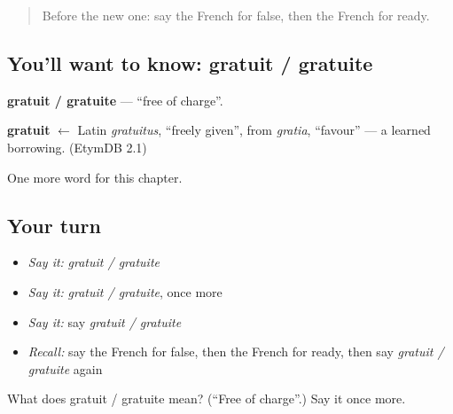 \label{lesson:FR-C245-gratuit-gratuite}



\begin{quote}
Before the new one: say the French for false, then the French for ready.
\end{quote}

\subsection*{You'll want to know: gratuit / gratuite}
\textbf{gratuit / gratuite} — \textquotedblleft{}free of charge\textquotedblright{}.

\begin{cousinweb}
\textbf{gratuit} $\leftarrow$ Latin \emph{gratuitus}, \textquotedblleft{}freely given\textquotedblright{}, from \emph{gratia}, \textquotedblleft{}favour\textquotedblright{} — a learned borrowing. (EtymDB 2.1)
\end{cousinweb}

\begin{grammarlens}[title={What you've built}]
One more word for this chapter.
\end{grammarlens}

\subsection*{Your turn}
\begin{itemize}
\raggedright
  \item \emph{Say it:} \emph{gratuit / gratuite}
  \item \emph{Say it:} \emph{gratuit / gratuite}, once more
  \item \emph{Say it:} say \emph{gratuit / gratuite}
  \item \emph{Recall:} say the French for false, then the French for ready, then say \emph{gratuit / gratuite} again
\end{itemize}

\begin{tcolorbox}[breakable,colback=teal!4,colframe=teal!35!black,title={Before you move on}]
What does gratuit / gratuite mean? (\textquotedblleft{}Free of charge\textquotedblright{}.) Say it once more.
\end{tcolorbox}
